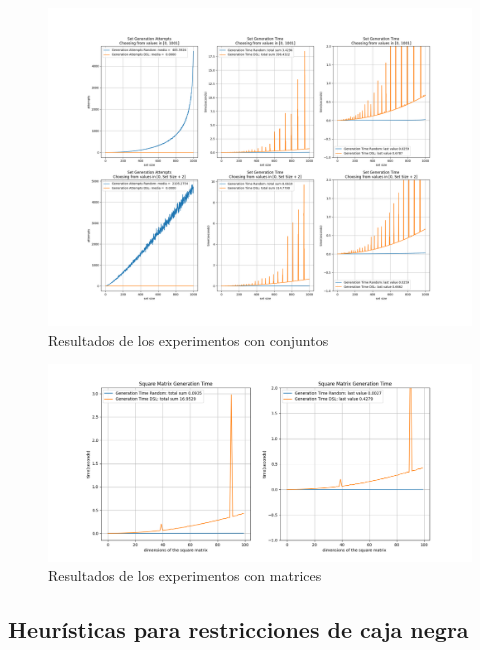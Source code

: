 \begin{figure}[H]
      \includegraphics[width=\linewidth]{Graphics/exp3.png}
      \caption{Resultados de los experimentos con conjuntos}
      \label{fig:exp3}
\end{figure}

\begin{figure}[!ht]
      \includegraphics[width=\linewidth]{Graphics/exp4.png}
      \caption{Resultados de los experimentos con matrices}
      \label{fig:exp4}
\end{figure}





\subsection{Heurísticas para restricciones de caja negra}

